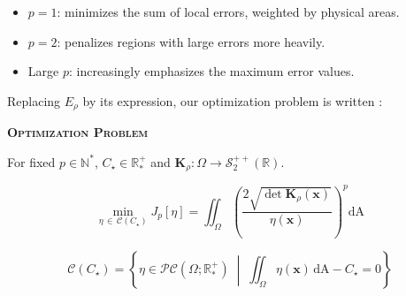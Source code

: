 \documentclass[11pt,a4paper]{article}
\begin{document}
\begin{itemize}
\item $p=1$: minimizes the sum of local errors, weighted by physical areas.
\item $p=2$: penalizes regions with large errors more heavily.
\item Large $p$: increasingly emphasizes the maximum error values.
\end{itemize}
\noindent
Replacing $E_\rho$ by its expression, our optimization problem is written :





\begin{fundamentalproblem}

{\color{OptBlue}\bfseries\small
\textsc{Optimization Problem}
}

\vspace{0.5em}

{\color{OptGrey}\small
For fixed $p\in\mathbb{N}^*$, $C_\star\in \mathbb{R}^+_*$ and
$\mathbf K_\rho:\Omega\to\mathscr S_2^{++}(\mathbb R)$.
}

\vspace{0.6em}

\begin{equation}
\label{eq:main_optimization_problem}
\displaystyle
\min_{\eta\,\in\,\mathscr C(C_\star)}
J_p[\eta]
=
\iint_\Omega
\left(
\frac{2\sqrt{\det\mathbf K_\rho(\mathbf x)}}
{\eta(\mathbf x)}
\right)^p
\mathrm{dA}
\end{equation}

\vspace{-0.4em}

\begin{equation*}
\mathscr C(C_\star)=
\left\{
\eta\in\mathcal{PC}(\Omega;\mathbb R_*^+)
\;\middle|\;
\iint_\Omega\eta(\mathbf x)\,\mathrm{dA} - C_\star =0
\right\}
\end{equation*}

\end{fundamentalproblem}



\end{document}

